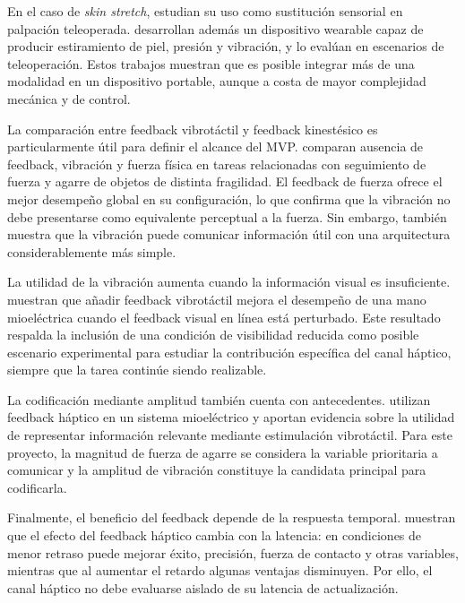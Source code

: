 En el caso de \textit{skin stretch}, \textcite{schorr2015skinstretch} estudian su uso como sustitución sensorial en palpación teleoperada. \textcite{aggravi2018wearablehaptic} desarrollan además un dispositivo wearable capaz de producir estiramiento de piel, presión y vibración, y lo evalúan en escenarios de teleoperación. Estos trabajos muestran que es posible integrar más de una modalidad en un dispositivo portable, aunque a costa de mayor complejidad mecánica y de control.

La comparación entre feedback vibrotáctil y feedback kinestésico es particularmente útil para definir el alcance del MVP. \textcite{park2022fingerfeedback} comparan ausencia de feedback, vibración y fuerza física en tareas relacionadas con seguimiento de fuerza y agarre de objetos de distinta fragilidad. El feedback de fuerza ofrece el mejor desempeño global en su configuración, lo que confirma que la vibración no debe presentarse como equivalente perceptual a la fuerza. Sin embargo, también muestra que la vibración puede comunicar información útil con una arquitectura considerablemente más simple.

La utilidad de la vibración aumenta cuando la información visual es insuficiente. \textcite{raveh2018vibrotactile} muestran que añadir feedback vibrotáctil mejora el desempeño de una mano mioeléctrica cuando el feedback visual en línea está perturbado. Este resultado respalda la inclusión de una condición de visibilidad reducida como posible escenario experimental para estudiar la contribución específica del canal háptico, siempre que la tarea continúe siendo realizable.

La codificación mediante amplitud también cuenta con antecedentes. \textcite{thomas2023hapticshared} utilizan feedback háptico en un sistema mioeléctrico y aportan evidencia sobre la utilidad de representar información relevante mediante estimulación vibrotáctil. Para este proyecto, la magnitud de fuerza de agarre se considera la variable prioritaria a comunicar y la amplitud de vibración constituye la candidata principal para codificarla.

Finalmente, el beneficio del feedback depende de la respuesta temporal. \textcite{louca2024haptic} muestran que el efecto del feedback háptico cambia con la latencia: en condiciones de menor retraso puede mejorar éxito, precisión, fuerza de contacto y otras variables, mientras que al aumentar el retardo algunas ventajas disminuyen. Por ello, el canal háptico no debe evaluarse aislado de su latencia de actualización.

